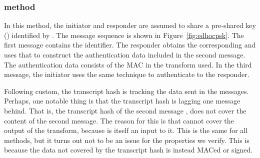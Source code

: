 \subsubsection{\mPskPsk{} method}
In this method, the initiator and responder are assumed to share a pre-shared
key (\mPsk) identified by \mIDPsk.
%
The message sequence is shown in Figure~\ref{fig:edhocpsk}.
%
The first message contains the \mIDPsk{} identifier.
%
The responder obtains the corresponding \mPsk{} and uses that to construct the
authentication data included in the second message.
%
The authentication data consists of the MAC in the \mAead{} transform used.
%
In the third message, the initiator uses the same technique to authenticate to
the responder.
%

Following custom, the transcript hash \mTH{} is tracking the data sent in the
messages.
%
Perhaps, one notable thing is that the transcript hash is lagging one message
behind.
%
That is, the transcript hash of the second message \mTHtwo{}, does not cover the
content of the second message.
%
The reason for this is that cannot cover the output of the \mAead{} transform,
because \mTHtwo{} is itself an input to it.
%
This is the same for all methods, but it turns out not to be an issue for the
properties we verify.
%
This is because the data not covered by the transcript hash is instead MACed or
signed.
%

